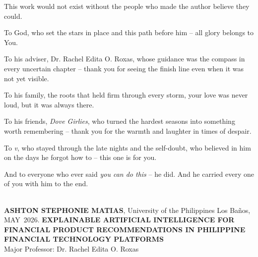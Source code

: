 \documentclass{icsthesis}
\renewcommand{\TITLE}{EXPLAINABLE ARTIFICIAL INTELLIGENCE FOR FINANCIAL PRODUCT RECOMMENDATIONS IN PHILIPPINE FINANCIAL TECHNOLOGY PLATFORMS}
\renewcommand{\AUTHOR}{ASHTON STEPHONIE MATIAS}
\renewcommand{\MONTH}{MAY}
\renewcommand{\YEAR}{2026}
\begin{document}
\begin{frontmatter}
\begin{biosketch}
			\addauthorsignaturefield
		\end{biosketch}	
		
		\begin{acknowledgement}
			This work would not exist without the people who made the author believe they could.

            To God, who set the stars in place and this path before him -- all glory belongs to You.

            To his adviser, Dr. Rachel Edita O. Roxas, whose guidance was the compass in every uncertain chapter -- thank you for seeing the finish line even when it was not yet visible.

            To his family, the roots that held firm through every storm, your love was never loud, but it was always there.

            To his friends, \textit{Dove Girlies}, who turned the hardest seasons into something worth remembering -- thank you for the warmth and laughter in times of despair.

            To \textit{v}, who stayed through the late nights and the self-doubt, who believed in him on the days he forgot how to -- this one is for you.


            And to everyone who ever said \textit{you can do this} -- he did. And he carried every one of you with him to the end.
		\end{acknowledgement}
		
		\maketableofcontents
		
		\makelistoftables

		\makelistoffigures
	
		
		\begin{abstractwithpageno}	
		\\
		\textbf{\AUTHOR}, University of the Philippines Los Ba\~{n}os, \MONTH\ \YEAR. \textbf{\TITLE}
		\\Major Professor: Dr. Rachel Edita O. Roxas\\
			

\end{abstractwithpageno}
\end{frontmatter}
\end{document}
